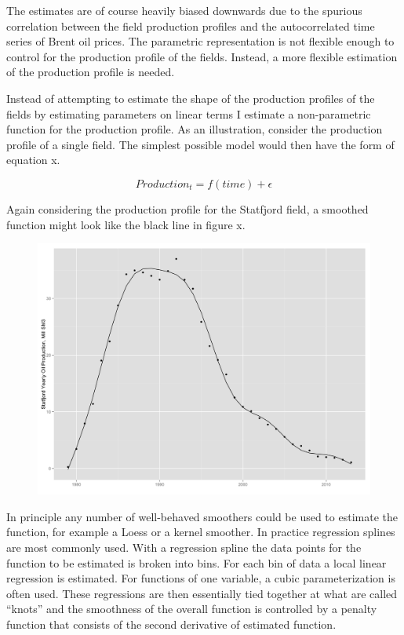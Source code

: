\documentclass[12pt]{scrartcl} %
\begin{document}
The estimates are of course heavily biased downwards due to the spurious correlation between the field production profiles and the autocorrelated time series of Brent oil prices.  The parametric representation is not flexible enough to control for the production profile of the fields.  Instead, a more flexible estimation of the production profile is needed. 

Instead of attempting to estimate the shape of the production profiles of the fields by estimating parameters on linear terms I estimate a non-parametric function for the production profile.  As an illustration, consider the production profile of a single field.  The simplest possible model would then have the form of equation x. 

\begin{equation}
Production_{t}=f(time) + \epsilon
\end{equation}

Again considering the production profile for the Statfjord field, a smoothed function might look like the black line in figure x.   

\begin{figure}
	\includegraphics[width=1\textwidth]{statfjord_gam.png}
\end{figure}

In principle any number of well-behaved smoothers could be used to estimate the function, for example a Loess or a kernel smoother.  In practice regression splines are most commonly used.  With a regression spline the data points for the function to be estimated is broken into bins.  For each bin of data a local linear regression is estimated.  For functions of one variable, a cubic parameterization is often used.  These regressions are then essentially tied together at what are called “knots” and the smoothness of the overall function is controlled by a penalty function that consists of the second derivative of estimated function.
\end{document}
